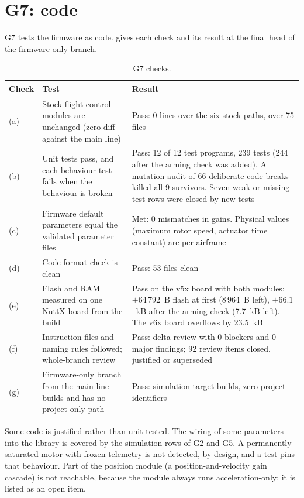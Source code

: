 \section{G7: code}\label{sec:val_g7}

G7 tests the firmware as code.
 gives each check and its result at the final head of the firmware-only branch.

\begin{table}[tbp]
\caption{G7 checks.}\label{tab:val_g7}
\centering
\small
\begin{tabularx}{\textwidth}{@{}l L{4.2cm} Y@{}}
\toprule
Check & Test & Result \\
\midrule
(a) & Stock flight-control modules are unchanged (zero diff against the main line) & Pass: 0 lines over the six stock paths, over 75 files \\
(b) & Unit tests pass, and each behaviour test fails when the behaviour is broken & Pass: 12 of 12 test programs, 239 tests (244 after the arming check was added). A mutation audit of 66 deliberate code breaks killed all 9 survivors. Seven weak or missing test rows were closed by new tests \\
(c) & Firmware default parameters equal the validated parameter files & Met: 0 mismatches in gains. Physical values (maximum rotor speed, actuator time constant) are per airframe \\
(d) & Code format check is clean & Pass: 53 files clean \\
(e) & Flash and RAM measured on one NuttX board from the build & Pass on the v5x board with both modules: $+64\,792$~B flash at first (8\,964~B left), $+66.1$~kB after the arming check (7.7~kB left). The v6x board overflows by 23.5~kB \\
(f) & Instruction files and naming rules followed; whole-branch review & Pass: delta review with 0 blockers and 0 major findings; 92 review items closed, justified or superseded \\
(g) & Firmware-only branch from the main line builds and has no project-only path & Pass: simulation target builds, zero project identifiers \\
\bottomrule
\end{tabularx}
\end{table}

Some code is justified rather than unit-tested.
The wiring of some parameters into the library is covered by the simulation rows of G2 and G5.
A permanently saturated motor with frozen telemetry is not detected, by design, and a test pins that behaviour.
Part of the position module (a position-and-velocity gain cascade) is not reachable, because the module always runs acceleration-only; it is listed as an open item.


